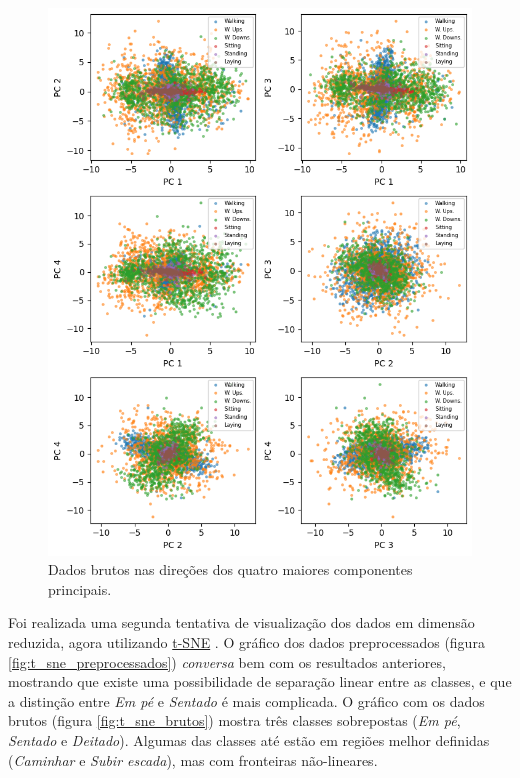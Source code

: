 \documentclass[final,5p]{elsarticle}
\numberwithin{equation}{section}
\begin{document}
        \begin{figure}[hbt!]
            \includegraphics[width=0.95\columnwidth]{C_PrincipalComponents_Raw.png}
            \caption{Dados brutos nas direções dos quatro maiores componentes principais.}
            \label{fig:pc_brutos}
        \end{figure}

        Foi realizada uma segunda tentativa de visualização dos dados em dimensão reduzida, agora utilizando \href{https://scikit-learn.org/stable/modules/generated/sklearn.manifold.TSNE.html}{t-SNE} \cite{van2008visualizing}. O gráfico dos dados preprocessados (figura \ref{fig:t_sne_preprocessados}) \emph{conversa} bem com os resultados anteriores, mostrando que existe uma possibilidade de separação linear entre as classes, e que a distinção entre \emph{Em pé} e \emph{Sentado} é mais complicada. O gráfico com os dados brutos (figura \ref{fig:t_sne_brutos}) mostra três classes sobrepostas (\emph{Em pé}, \emph{Sentado} e \emph{Deitado}). Algumas das classes até estão em regiões melhor definidas (\emph{Caminhar} e \emph{Subir escada}), mas com fronteiras não-lineares.
\end{document}
